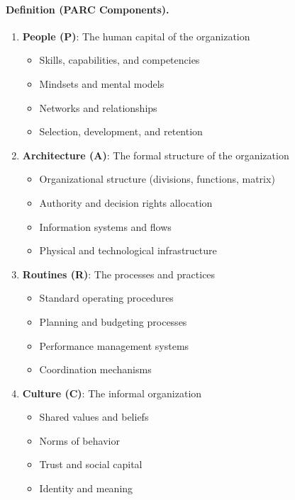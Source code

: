 \paragraph{Definition (PARC Components).}
\begin{enumerate}
    \item \textbf{People (P)}: The human capital of the organization
    \begin{itemize}
        \item Skills, capabilities, and competencies
        \item Mindsets and mental models
        \item Networks and relationships
        \item Selection, development, and retention
    \end{itemize}
    
    \item \textbf{Architecture (A)}: The formal structure of the organization
    \begin{itemize}
        \item Organizational structure (divisions, functions, matrix)
        \item Authority and decision rights allocation
        \item Information systems and flows
        \item Physical and technological infrastructure
    \end{itemize}
    
    \item \textbf{Routines (R)}: The processes and practices
    \begin{itemize}
        \item Standard operating procedures
        \item Planning and budgeting processes
        \item Performance management systems
        \item Coordination mechanisms
    \end{itemize}
    
    \item \textbf{Culture (C)}: The informal organization
    \begin{itemize}
        \item Shared values and beliefs
        \item Norms of behavior
        \item Trust and social capital
        \item Identity and meaning
    \end{itemize}
\end{enumerate}

